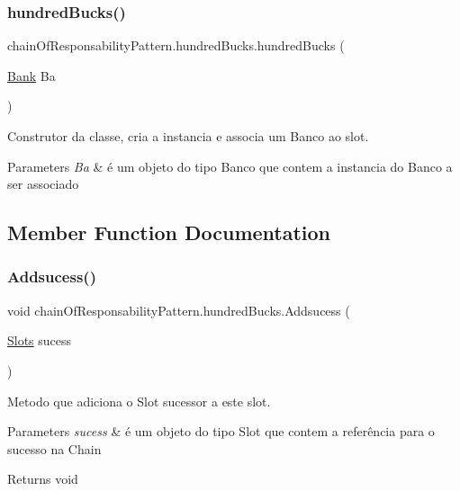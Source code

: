 \subsubsection{\texorpdfstring{hundredBucks()}{hundredBucks()}}
{\footnotesize\ttfamily chain\+Of\+Responsability\+Pattern.\+hundred\+Bucks.\+hundred\+Bucks (\begin{DoxyParamCaption}\item[{\mbox{\hyperlink{classmediator_pattern_1_1_bank}{Bank}}}]{Ba }\end{DoxyParamCaption})}



Construtor da classe, cria a instancia e associa um Banco ao slot. 


\begin{DoxyParams}{Parameters}
{\em Ba} & é um objeto do tipo Banco que contem a instancia do Banco a ser associado \\
\hline
\end{DoxyParams}


\subsection{Member Function Documentation}
\mbox{\label{classchain_of_responsability_pattern_1_1hundred_bucks_a4bacbb9fbd8e7c3d6fef720b52368add}} 
\subsubsection{\texorpdfstring{Addsucess()}{Addsucess()}}
{\footnotesize\ttfamily void chain\+Of\+Responsability\+Pattern.\+hundred\+Bucks.\+Addsucess (\begin{DoxyParamCaption}\item[{\mbox{\hyperlink{interfacechain_of_responsability_pattern_1_1_slots}{Slots}}}]{sucess }\end{DoxyParamCaption})}



Metodo que adiciona o Slot sucessor a este slot. 


\begin{DoxyParams}{Parameters}
{\em sucess} & é um objeto do tipo Slot que contem a referência para o sucesso na Chain \\
\hline
\end{DoxyParams}
\begin{DoxyReturn}{Returns}
void 
\end{DoxyReturn}
\mbox{\label{classchain_of_responsability_pattern_1_1hundred_bucks_adef35c81f1111468fc8a3de01512b85e}} 
